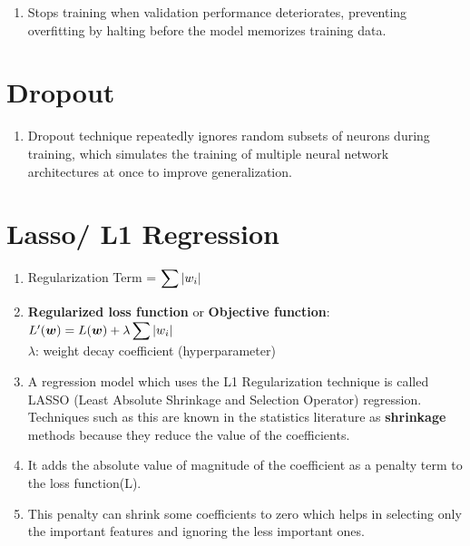 \begin{enumerate}
    \item Stops training when validation performance deteriorates, preventing overfitting by halting before the model memorizes training data.
    \hfill \cite{wiki/Regularization_mathematics}
\end{enumerate}





\section{Dropout}

\begin{enumerate}
    \item Dropout technique repeatedly ignores random subsets of neurons during training, which simulates the training of multiple neural network architectures at once to improve generalization.
    \hfill \cite{wiki/Regularization_mathematics}
\end{enumerate}





\section{Lasso/ L1 Regression}

\begin{enumerate}
    \item Regularization Term = $ \displaystyle\sum \left| w_i \right|$
    \hfill \cite{geeksforgeeks/machine-learning/regularization-in-machine-learning}

    \item \textbf{Regularized loss function} or \textbf{Objective function}:
    $
        L^\prime (\bm{w}) = L (\bm{w}) + \lambda \displaystyle\sum \left| w_i \right|
    $
    \\
    $\lambda$: weight decay coefficient (hyperparameter)

    \item A regression model which uses the L1 Regularization technique is called LASSO (Least Absolute Shrinkage and Selection Operator) regression. 
    Techniques such as this are known in the statistics literature as \textbf{shrinkage} methods because they reduce the value of the coefficients. 
    \hfill \cite{geeksforgeeks/machine-learning/regularization-in-machine-learning}
    
    \item It adds the absolute value of magnitude of the coefficient as a penalty term to the loss function(L). 
    \hfill \cite{geeksforgeeks/machine-learning/regularization-in-machine-learning}
    
    \item This penalty can shrink some coefficients to zero which helps in selecting only the important features and ignoring the less important ones.
    \hfill \cite{geeksforgeeks/machine-learning/regularization-in-machine-learning}
\end{enumerate}




